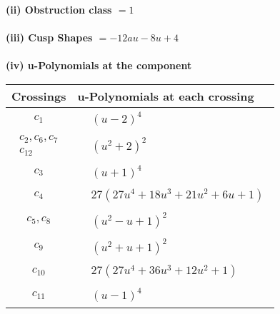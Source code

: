 \documentclass[1p]{elsarticle_modified}
\theoremstyle{definition}
\begin{document}
\flushleft \textbf{(ii) Obstruction class $= 1$}\\~\\
\flushleft \textbf{(iii) Cusp Shapes $= -12 a u-8 u+4$}\\~\\
\newpage\renewcommand{\arraystretch}{1}
\flushleft \textbf{(iv) u-Polynomials at the component}\newline \\
\begin{tabular}{m{50pt}|m{274pt}}
Crossings & \hspace{64pt}u-Polynomials at each crossing \\
\hline $$\begin{aligned}c_{1}\end{aligned}$$&$\begin{aligned}
&(u-2)^4
\end{aligned}$\\
\hline $$\begin{aligned}c_{2},c_{6},c_{7}\\c_{12}\end{aligned}$$&$\begin{aligned}
&(u^2+2)^2
\end{aligned}$\\
\hline $$\begin{aligned}c_{3}\end{aligned}$$&$\begin{aligned}
&(u+1)^4
\end{aligned}$\\
\hline $$\begin{aligned}c_{4}\end{aligned}$$&$\begin{aligned}
&27(27 u^4+18 u^3+21 u^2+6 u+1)
\end{aligned}$\\
\hline $$\begin{aligned}c_{5},c_{8}\end{aligned}$$&$\begin{aligned}
&(u^2- u+1)^2
\end{aligned}$\\
\hline $$\begin{aligned}c_{9}\end{aligned}$$&$\begin{aligned}
&(u^2+u+1)^2
\end{aligned}$\\
\hline $$\begin{aligned}c_{10}\end{aligned}$$&$\begin{aligned}
&27(27 u^4+36 u^3+12 u^2+1)
\end{aligned}$\\
\hline $$\begin{aligned}c_{11}\end{aligned}$$&$\begin{aligned}
&(u-1)^4
\end{aligned}$\\
\hline
\end{tabular}\\~\\
\end{document}
